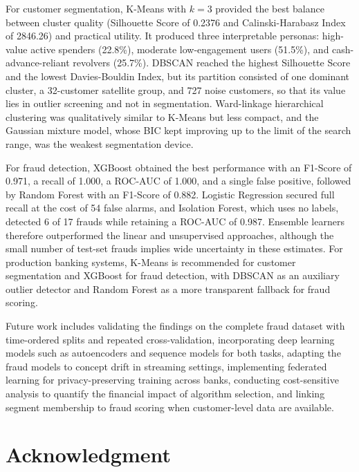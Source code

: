 \documentclass[conference]{IEEEtran}
\begin{document}
For customer segmentation, K-Means with $k=3$ provided the best balance between cluster quality (Silhouette Score of 0.2376 and Calinski-Harabasz Index of 2846.26) and practical utility. It produced three interpretable personas: high-value active spenders (22.8\%), moderate low-engagement users (51.5\%), and cash-advance-reliant revolvers (25.7\%). DBSCAN reached the highest Silhouette Score and the lowest Davies-Bouldin Index, but its partition consisted of one dominant cluster, a 32-customer satellite group, and 727 noise customers, so that its value lies in outlier screening and not in segmentation. Ward-linkage hierarchical clustering was qualitatively similar to K-Means but less compact, and the Gaussian mixture model, whose BIC kept improving up to the limit of the search range, was the weakest segmentation device.

For fraud detection, XGBoost obtained the best performance with an F1-Score of 0.971, a recall of 1.000, a ROC-AUC of 1.000, and a single false positive, followed by Random Forest with an F1-Score of 0.882. Logistic Regression secured full recall at the cost of 54 false alarms, and Isolation Forest, which uses no labels, detected 6 of 17 frauds while retaining a ROC-AUC of 0.987. Ensemble learners therefore outperformed the linear and unsupervised approaches, although the small number of test-set frauds implies wide uncertainty in these estimates. For production banking systems, K-Means is recommended for customer segmentation and XGBoost for fraud detection, with DBSCAN as an auxiliary outlier detector and Random Forest as a more transparent fallback for fraud scoring.

Future work includes validating the findings on the complete fraud dataset with time-ordered splits and repeated cross-validation, incorporating deep learning models such as autoencoders and sequence models for both tasks, adapting the fraud models to concept drift in streaming settings, implementing federated learning for privacy-preserving training across banks, conducting cost-sensitive analysis to quantify the financial impact of algorithm selection, and linking segment membership to fraud scoring when customer-level data are available.

\section*{Acknowledgment}
\end{document}
